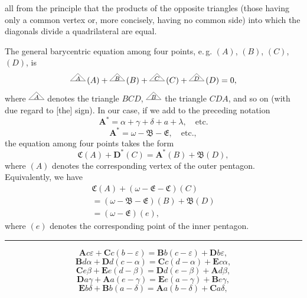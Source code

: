 all from the principle that the products of the opposite triangles (those
having only a common vertex or, more concisely, having no common side) into
which the diagonals divide a quadrilateral are equal.

The general barycentric equation among four points, e.\,g. $(A)$, $(B)$, $(C)$,
$(D)$, is
\[
\TriLetter{A}\,(A)+\TriLetter{B}\,(B)+\TriLetter{C}\,(C)+\TriLetter{D}\,(D)=0,
\]
where $\TriLetter{A}$ denotes the triangle $BCD$, $\TriLetter{B}$ the triangle $CDA$,
and so on (with due regard to [the] sign). In our case, if we add to the
preceding notation
\[
\boldsymbol{A}^{*}=\alpha+\gamma+\delta+a+\lambda, \quad \text{etc.}
\]
\[
\boldsymbol{A}^{*}=\omega-\mathfrak{B}-\mathfrak{E}, \quad \text{etc.},
\]
the equation among four points takes the form
\[
\mathfrak{C}(A)+\boldsymbol{D}^{*}(C)=\boldsymbol{A}^{*}(B)+\mathfrak{B}(D),
\]
where $(A)$ denotes the corresponding vertex of the outer pentagon. Equivalently, we have
\[
\begin{gathered}\mathfrak{C}(A)+(\omega-\mathfrak{E}-\mathfrak{C})(C)\\=(\omega-\mathfrak{B}-\mathfrak{E})(B)+\mathfrak{B}(D)\\=(\omega-\mathfrak{E})(e),\end{gathered}
\]
where $(e)$ denotes the corresponding point of the inner pentagon.

\begin{center}\rule{3cm}{.4pt}\end{center}

\begin{center}\resizebox{7cm}{!}{}\end{center}

\[
\boldsymbol{A}c\varepsilon+\boldsymbol{C}c(b-\varepsilon)=\boldsymbol{B}b(c-\varepsilon)+\boldsymbol{D}b\varepsilon,
\]
\[
\boldsymbol{B}d\alpha+\boldsymbol{D}d(c-\alpha)=\boldsymbol{C}c(d-\alpha)+\boldsymbol{E}c\alpha,
\]
\[
\boldsymbol{C}e\beta+\boldsymbol{E}e(d-\beta)=\boldsymbol{D}d(e-\beta)+\boldsymbol{A}d\beta,
\]
\[
\boldsymbol{D}a\gamma+\boldsymbol{A}a(e-\gamma)=\boldsymbol{E}e(a-\gamma)+\boldsymbol{B}e\gamma,
\]
\[
\boldsymbol{E}b\delta+\boldsymbol{B}b(a-\delta)=\boldsymbol{A}a(b-\delta)+\boldsymbol{C}a\delta,
\]

